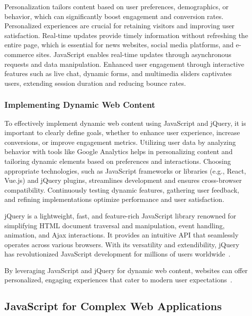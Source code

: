 \documentclass[conference]{IEEEtran}
\begin{document}
Personalization tailors content based on user preferences, demographics, or behavior, which can significantly boost engagement and conversion rates. Personalized experiences are crucial for retaining visitors and improving user satisfaction. Real-time updates provide timely information without refreshing the entire page, which is essential for news websites, social media platforms, and e-commerce sites. JavaScript enables real-time updates through asynchronous requests and data manipulation. Enhanced user engagement through interactive features such as live chat, dynamic forms, and multimedia sliders captivates users, extending session duration and reducing bounce rates.
\newline
\subsubsection{Implementing Dynamic Web Content}

To effectively implement dynamic web content using JavaScript and jQuery, it is important to clearly define goals, whether to enhance user experience, increase conversions, or improve engagement metrics. Utilizing user data by analyzing behavior with tools like Google Analytics helps in personalizing content and tailoring dynamic elements based on preferences and interactions. Choosing appropriate technologies, such as JavaScript frameworks or libraries (e.g., React, Vue.js) and jQuery plugins, streamlines development and ensures cross-browser compatibility. Continuously testing dynamic features, gathering user feedback, and refining implementations optimize performance and user satisfaction.

jQuery is a lightweight, fast, and feature-rich JavaScript library renowned for simplifying HTML document traversal and manipulation, event handling, animation, and Ajax interactions. It provides an intuitive API that seamlessly operates across various browsers. With its versatility and extendibility, jQuery has revolutionized JavaScript development for millions of users worldwide~\cite{jquery_history}.

By leveraging JavaScript and jQuery for dynamic web content, websites can offer personalized, engaging experiences that cater to modern user expectations~\cite{moldstud2024}.
\newline
\subsection{JavaScript for Complex Web Applications}
\end{document}
